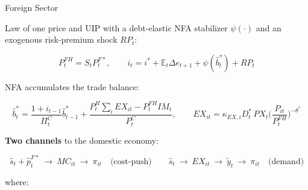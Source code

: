\documentclass[aspectratio=43, 10pt]{beamer}
\begin{document}
\begin{frame}{Foreign Sector}

\footnotesize

Law of one price and UIP with a debt-elastic NFA stabilizer $\psi(\cdot)$ and an exogenous risk-premium shock $RP_t$:

\vspace{10pt}
\[
P_t^{FH}=S_tP_t^{F*},
\qquad
i_t = i^*+\mathbb E_t\Delta e_{t+1}+\psi(\hat b_t^*)+RP_t
\]
\vspace{10pt}

NFA accumulates the trade balance:

\vspace{10pt}
\[
\hat b_t^*=\frac{1+i_{t-1}}{\Pi_t^C}\hat b_{t-1}^*+\frac{P_t^H\sum_iEX_{it}-P_t^{FH}IM_t}{P_t^C},
\qquad
EX_{it}=\kappa_{EX,i}D_t^*\,PX_t\Big(\frac{P_{it}}{P_t^{FH}}\Big)^{-\theta^*}
\]
\vspace{10pt}

\textbf{Two channels} to the domestic economy:

\vspace{10pt}
\[
\hat s_t+\hat p_t^{F*}\ \rightarrow\ MC_{it}\ \rightarrow\ \pi_{it}
\quad\text{(cost-push)}
\qquad
\hat s_t\ \rightarrow\ EX_{it}\ \rightarrow\ \tilde y_t\ \rightarrow\ \pi_{it}
\quad\text{(demand)}
\]

\vspace{6pt}
{\footnotesize where:}

\vspace{4pt}

\end{frame}
\end{document}
